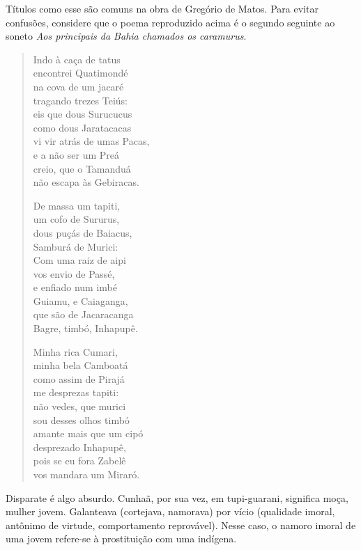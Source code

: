Títulos como esse são comuns na obra de Gregório de Matos. Para evitar confusões, considere que o poema reproduzido acima é o segundo seguinte ao soneto \textit{Aos principais da Bahia chamados os caramurus}.

\begin{verse}
Indo à caça de tatus \\
encontrei Quatimondé \\
na cova de um jacaré \\
tragando trezes Teiús: \\
eis que dous Surucucus \\
como dous Jaratacacas\\
vi vir atrás de umas Pacas,\\
e a não ser um Preá \\
creio, que o Tamanduá \\
não escapa às Gebiracas.
			
De massa um tapiti, \\
um cofo de Sururus, \\
dous puçás de Baiacus, \\
Samburá de Murici: \\
Com uma raiz de aipi \\
vos envio de Passé, \\
e enfiado num imbé \\
Guiamu, e Caiaganga, \\
que são de Jacaracanga \\
Bagre, timbó, Inhapupê.
			
Minha rica Cumari, \\
minha bela Camboatá \\
como assim de Pirajá \\
me desprezas tapiti: \\
não vedes, que murici \\
sou desses olhos timbó \\
amante mais que um cipó \\
desprezado Inhapupê, \\
pois se eu fora Zabelê \\
vos mandara um Miraró.
\end{verse}

Disparate é algo absurdo. Cunhaã, por sua vez, em tupi-guarani, significa moça, mulher jovem. Galanteava (cortejava, namorava) por vício (qualidade imoral, antônimo de virtude, comportamento reprovável). Nesse caso, o namoro imoral de uma jovem refere-se à prostituição com uma indígena.

